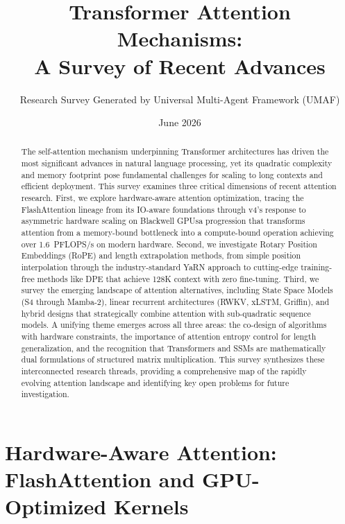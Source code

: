 \documentclass[11pt,a4paper]{article}
\title{\textbf{Transformer Attention Mechanisms:\\A Survey of Recent Advances}}
\author{Research Survey Generated by Universal Multi-Agent Framework (UMAF)}
\date{June 2026}
\begin{document}
\maketitle

\begin{abstract}
The self-attention mechanism underpinning Transformer architectures has driven the most significant advances in natural language processing, yet its quadratic complexity and memory footprint pose fundamental challenges for scaling to long contexts and efficient deployment. This survey examines three critical dimensions of recent attention research. First, we explore hardware-aware attention optimization, tracing the FlashAttention lineage from its IO-aware foundations through v4's response to asymmetric hardware scaling on Blackwell GPUs\textemdash a progression that transforms attention from a memory-bound bottleneck into a compute-bound operation achieving over 1.6~PFLOPS/s on modern hardware. Second, we investigate Rotary Position Embeddings (RoPE) and length extrapolation methods, from simple position interpolation through the industry-standard YaRN approach to cutting-edge training-free methods like DPE that achieve 128K context with zero fine-tuning. Third, we survey the emerging landscape of attention alternatives, including State Space Models (S4 through Mamba-2), linear recurrent architectures (RWKV, xLSTM, Griffin), and hybrid designs that strategically combine attention with sub-quadratic sequence models. A unifying theme emerges across all three areas: the co-design of algorithms with hardware constraints, the importance of attention entropy control for length generalization, and the recognition that Transformers and SSMs are mathematically dual formulations of structured matrix multiplication. This survey synthesizes these interconnected research threads, providing a comprehensive map of the rapidly evolving attention landscape and identifying key open problems for future investigation.
\end{abstract}

\section{Hardware-Aware Attention: FlashAttention and GPU-Optimized Kernels}
\label{sec:hardware}
\end{document}
